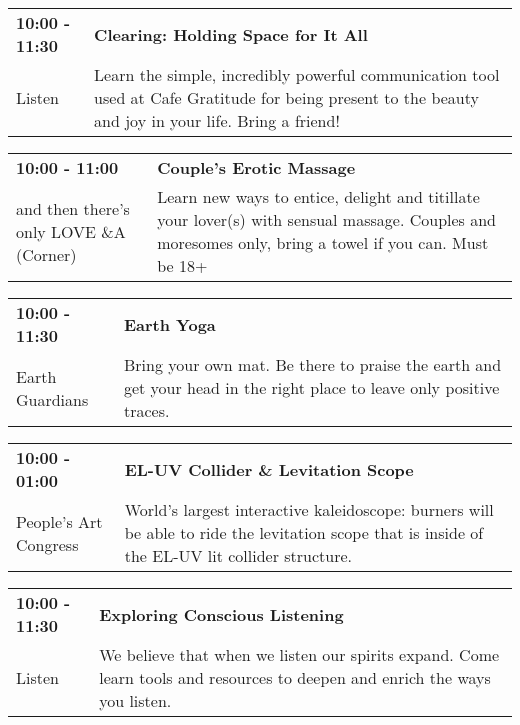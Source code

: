 \begin{tabular}{ p{1in} p{2.2in} }
    \textbf{10:00 - 11:30} & \textbf{Clearing: Holding Space for It All} \\
    Listen \newline  & Learn the simple, incredibly powerful communication tool used at Cafe Gratitude for being present to the beauty and joy in your life. Bring a friend! \\
    \hline 
\end{tabular}
    
\begin{tabular}{ p{1in} p{2.2in} }
    \textbf{10:00 - 11:00} & \textbf{Couple's Erotic Massage} \\
    and then there's only LOVE \newline 4\&A (Corner) & Learn new ways to entice, delight and titillate your lover(s) with sensual massage. Couples and moresomes only, bring a towel if you can.  Must be 18+ \\
    \hline 
\end{tabular}
    
\begin{tabular}{ p{1in} p{2.2in} }
    \textbf{10:00 - 11:30} & \textbf{Earth Yoga} \\
    Earth Guardians \newline  & Bring your own mat. Be there to praise the earth and get your head in the right place to leave only positive traces. \\
    \hline 
\end{tabular}
    
\begin{tabular}{ p{1in} p{2.2in} }
    \textbf{10:00 - 01:00} & \textbf{EL-UV Collider \& Levitation Scope} \\
    People's Art Congress \newline  & World's largest interactive kaleidoscope: burners will be able to ride the levitation scope that is inside of the EL-UV lit collider structure. \\
    \hline 
\end{tabular}
    
\begin{tabular}{ p{1in} p{2.2in} }
    \textbf{10:00 - 11:30} & \textbf{Exploring Conscious Listening} \\
    Listen \newline  & We believe that when we listen our spirits expand. Come learn tools and resources to deepen and enrich the ways you listen. \\
    \hline 
\end{tabular}
    
